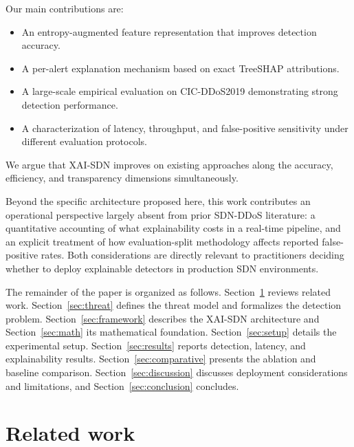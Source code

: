 \documentclass{ieeeaccess}
\begin{document}
Our main contributions are:
\begin{itemize}
\item An entropy-augmented feature representation that improves detection accuracy.
\item A per-alert explanation mechanism based on exact TreeSHAP attributions.
\item A large-scale empirical evaluation on CIC-DDoS2019 demonstrating strong detection performance.
\item A characterization of latency, throughput, and false-positive sensitivity under different evaluation protocols.
\end{itemize}

We argue that XAI-SDN improves on existing approaches along the accuracy, efficiency, and transparency dimensions simultaneously.

Beyond the specific architecture proposed here, this work contributes an operational perspective largely absent from prior SDN-DDoS literature: a quantitative accounting of what explainability costs in a real-time pipeline, and an explicit treatment of how evaluation-split methodology affects reported false-positive rates. Both considerations are directly relevant to practitioners deciding whether to deploy explainable detectors in production SDN environments.

The remainder of the paper is organized as follows. Section~\ref{sec:related} reviews related work. Section~\ref{sec:threat} defines the threat model and formalizes the detection problem. Section~\ref{sec:framework} describes the XAI-SDN architecture and Section~\ref{sec:math} its mathematical foundation. Section~\ref{sec:setup} details the experimental setup. Section~\ref{sec:results} reports detection, latency, and explainability results. Section~\ref{sec:comparative} presents the ablation and baseline comparison. Section~\ref{sec:discussion} discusses deployment considerations and limitations, and Section~\ref{sec:conclusion} concludes.

\section{Related work}
\label{sec:related}
\end{document}
